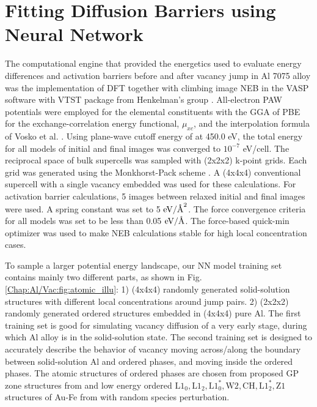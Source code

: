 \section{Fitting Diffusion Barriers using Neural Network}
\label{Chap:Al/Vac:section:NN}

The computational engine that provided the energetics used to evaluate energy differences and activation barriers before and after vacancy jump in Al 7075 alloy was the implementation of \ac{DFT} together with climbing image \acf{NEB} in the \ac{VASP} software with VTST package from Henkelman's group \cite{henkelman2000climbing,henkelman2000improved}. All-electron \ac{PAW} potentials were employed for the elemental constituents with the \ac{GGA} of \ac{PBE} for the exchange-correlation energy functional, $\mu_{xc}$, and the interpolation formula of Vosko et al. \cite{vosko1980accurate}. Using plane-wave cutoff energy of at 450.0 eV, the total energy for all models of initial and final images was converged to $10^{−7}$ eV/cell. The reciprocal space of bulk supercells was sampled with (2x2x2) k-point grids. Each grid was generated using the Monkhorst-Pack scheme \cite{monkhorst1976special}. A (4x4x4) conventional supercell with a single vacancy embedded was used for these calculations. For activation barrier calculations, 5 images between relaxed initial and final images were used. A spring constant was set to 5 $\text{eV}/\mbox{\normalfont\AA}^2$. The force convergence criteria for all models was set to be less than 0.05 $\text{eV}/\mbox{\normalfont\AA}$. The force-based quick-min optimizer was used to make \ac{NEB} calculations stable for high local concentration cases. \cite{sheppard2008optimization}


To sample a larger potential energy landscape, our \ac{NN} model training set contains mainly two different parts, as shown in Fig. \ref{Chap:Al/Vac:fig:atomic_illu}: 1) (4x4x4) randomly generated solid-solution structures with different local concentrations around jump pairs. 2) (2x2x2) randomly generated ordered structures embedded in (4x4x4) pure Al. The first training set is good for simulating vacancy diffusion of a very early stage, during which Al alloy is in the solid-solution state. The second training set is designed to accurately describe the behavior of vacancy moving across/along the boundary between solid-solution Al and ordered phases, and moving inside the ordered phases. The atomic structures of ordered phases are chosen from proposed GP zone structures from \cite{berg2001gp} and low energy ordered $\text{L1}_\text{0}, \text{L1}_\text{2}, \text{L1}_\text{0}^*, \text{W2}, \text{CH}, \text{L1}_\text{2}^*, \text{Z1}$ structures of Au-Fe from \cite{zhuravlev2017phase} with random species perturbation. 


